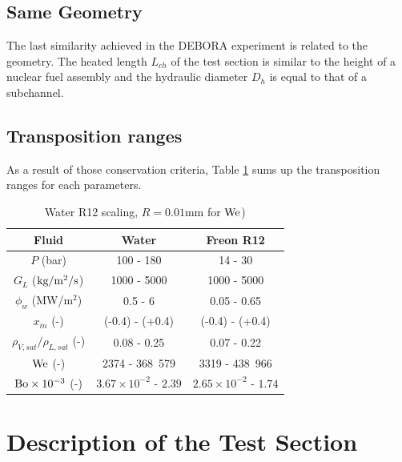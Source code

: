 \subsection{Same Geometry}

The last similarity achieved in the DEBORA experiment is related to the geometry. The heated length $L_{ch}$ of the test section is similar to the height of a nuclear fuel assembly and the hydraulic diameter $D_{h}$ is equal to that of a subchannel.


\subsection{Transposition ranges}

As a result of those conservation criteria, Table \ref{tab:R12_PWR_transposition} sums up the transposition ranges for each parameters.



\begin{table}[!h]
\centering
\begin{tabular}{c||c|c} 

Fluid & Water & Freon R12 \\
\hline \hline
$P$ (bar) & 100 - 180 & 14 - 30\\
%
$G_{L}$ ($\text{kg/m$^{2}$/s}$) & 1000 - 5000 & 1000 - 5000\\
%
$\phi_{w}$ (MW/m$^{2}$) & 0.5 - 6 & 0.05 - 0.65\\ 
%
$x_{in}$ (-) & (-0.4) - (+0.4) & (-0.4) - (+0.4)\\
\hline
\hline 
${\rho_{V,sat}}/{\rho_{L,sat}}$ (-) & 0.08 - 0.25 & 0.07 - 0.22\\
%
$\mathrm{We}$ (-) & 2374 - 368~579 & 3319 - 438~966\\
%
$\mathrm{Bo} \times 10^{-3} $ (-) &  $3.67\times 10^{-2}$ - $2.39 $ & $2.65\times 10^{-2}$ - $1.74$ \\
\hline
\end{tabular}

\caption{Water R12 scaling, $R=0.01$mm for $\mathrm{We}$)}
\label{tab:R12_PWR_transposition}

\end{table}



\section{Description of the Test Section}



